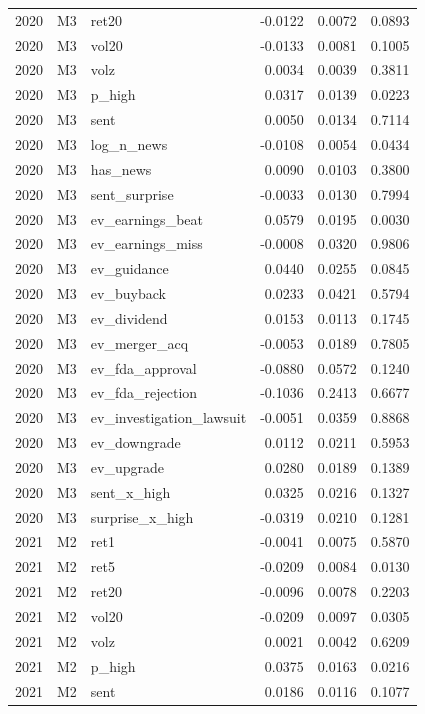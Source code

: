 \begin{tabular}{rllrrr}
2020 & M3 & ret20 & -0.0122 & 0.0072 & 0.0893 \\
2020 & M3 & vol20 & -0.0133 & 0.0081 & 0.1005 \\
2020 & M3 & volz & 0.0034 & 0.0039 & 0.3811 \\
2020 & M3 & p\_high & 0.0317 & 0.0139 & 0.0223 \\
2020 & M3 & sent & 0.0050 & 0.0134 & 0.7114 \\
2020 & M3 & log\_n\_news & -0.0108 & 0.0054 & 0.0434 \\
2020 & M3 & has\_news & 0.0090 & 0.0103 & 0.3800 \\
2020 & M3 & sent\_surprise & -0.0033 & 0.0130 & 0.7994 \\
2020 & M3 & ev\_earnings\_beat & 0.0579 & 0.0195 & 0.0030 \\
2020 & M3 & ev\_earnings\_miss & -0.0008 & 0.0320 & 0.9806 \\
2020 & M3 & ev\_guidance & 0.0440 & 0.0255 & 0.0845 \\
2020 & M3 & ev\_buyback & 0.0233 & 0.0421 & 0.5794 \\
2020 & M3 & ev\_dividend & 0.0153 & 0.0113 & 0.1745 \\
2020 & M3 & ev\_merger\_acq & -0.0053 & 0.0189 & 0.7805 \\
2020 & M3 & ev\_fda\_approval & -0.0880 & 0.0572 & 0.1240 \\
2020 & M3 & ev\_fda\_rejection & -0.1036 & 0.2413 & 0.6677 \\
2020 & M3 & ev\_investigation\_lawsuit & -0.0051 & 0.0359 & 0.8868 \\
2020 & M3 & ev\_downgrade & 0.0112 & 0.0211 & 0.5953 \\
2020 & M3 & ev\_upgrade & 0.0280 & 0.0189 & 0.1389 \\
2020 & M3 & sent\_x\_high & 0.0325 & 0.0216 & 0.1327 \\
2020 & M3 & surprise\_x\_high & -0.0319 & 0.0210 & 0.1281 \\
2021 & M2 & ret1 & -0.0041 & 0.0075 & 0.5870 \\
2021 & M2 & ret5 & -0.0209 & 0.0084 & 0.0130 \\
2021 & M2 & ret20 & -0.0096 & 0.0078 & 0.2203 \\
2021 & M2 & vol20 & -0.0209 & 0.0097 & 0.0305 \\
2021 & M2 & volz & 0.0021 & 0.0042 & 0.6209 \\
2021 & M2 & p\_high & 0.0375 & 0.0163 & 0.0216 \\
2021 & M2 & sent & 0.0186 & 0.0116 & 0.1077 \\

\end{tabular}
